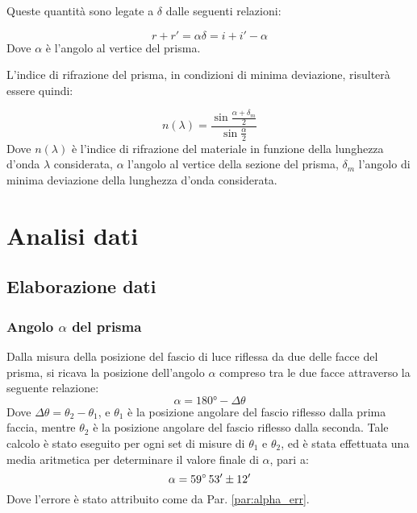 \documentclass[]{article}
\let\oldsection\section%
\renewcommand{\section}{%
	\renewcommand{\theequation}{\thesection.\arabic{equation}}%
	\oldsection}%
\let\oldsubsection\subsection%
\renewcommand{\subsection}{%
	\renewcommand{\theequation}{\thesubsection.\arabic{equation}}%
	\oldsubsection}%
\begin{document}
    Queste quantità sono legate a $\delta$ dalle seguenti relazioni:

    \begin{equation}
        \label{relazioni_delta}
        r + r' = \alpha
        \delta = i + i' - \alpha
    \end{equation}
    Dove $\alpha$ è l'angolo al vertice del prisma.

    L'indice di rifrazione del prisma, in condizioni di minima deviazione, risulterà essere quindi:

    \begin{equation}
        \label{indice_rifrazione}
        n(\lambda)=\frac{\sin \frac{\alpha + \delta _m} {2}}{\sin \frac{\alpha}{2}}
    \end{equation}
    Dove $n(\lambda)$ è l'indice di rifrazione del materiale in funzione della lunghezza d'onda $\lambda$ considerata, $\alpha$ l'angolo al vertice della sezione del prisma, $\delta _m $ l'angolo di minima deviazione della lunghezza d'onda considerata.


    \section{Analisi dati}
    \subsection{Elaborazione dati}
    \subsubsection{Angolo $\alpha$ del prisma}
    Dalla misura della posizione del fascio di luce riflessa da due delle facce del prisma, si ricava la posizione dell'angolo $\alpha$ compreso tra le due facce attraverso la seguente relazione:
    \begin{equation}
        \label{alpha}
        \alpha = 180° - \Delta\theta
    \end{equation}
    Dove $\Delta\theta=\theta_2-\theta_1$, e $\theta_1$ è la posizione angolare del fascio riflesso dalla prima faccia, mentre $\theta_2$ è la posizione angolare del fascio riflesso dalla seconda.
    Tale calcolo è stato eseguito per ogni set di misure di $\theta_1$ e $\theta_2$, ed è stata effettuata una media aritmetica per determinare il valore finale di $\alpha$, pari a: 
    \begin{equation}
        \label{alpha-value}
        \alpha = 59 \degree \, 53' \pm 12'
    \end{equation}
    Dove l'errore è stato attribuito come da Par. \ref{par:alpha_err}.
\end{document}

